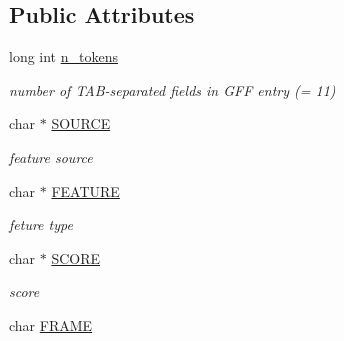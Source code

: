 \subsection*{Public Attributes}
\begin{DoxyCompactItemize}
\item 
\hypertarget{classGenomicRegionGFF_aaec963f555e7e807fb5046566622f5ee}{
long int \hyperlink{classGenomicRegionGFF_aaec963f555e7e807fb5046566622f5ee}{n\_\-tokens}}
\label{classGenomicRegionGFF_aaec963f555e7e807fb5046566622f5ee}

\begin{DoxyCompactList}\small\item\em number of TAB-\/separated fields in GFF entry (= 11) \end{DoxyCompactList}\item 
\hypertarget{classGenomicRegionGFF_a2f0d4a5f15d8a756233436af03341734}{
char $\ast$ \hyperlink{classGenomicRegionGFF_a2f0d4a5f15d8a756233436af03341734}{SOURCE}}
\label{classGenomicRegionGFF_a2f0d4a5f15d8a756233436af03341734}

\begin{DoxyCompactList}\small\item\em feature source \end{DoxyCompactList}\item 
\hypertarget{classGenomicRegionGFF_a0de447fbfad3da5b7a9cf07a5a6980f0}{
char $\ast$ \hyperlink{classGenomicRegionGFF_a0de447fbfad3da5b7a9cf07a5a6980f0}{FEATURE}}
\label{classGenomicRegionGFF_a0de447fbfad3da5b7a9cf07a5a6980f0}

\begin{DoxyCompactList}\small\item\em feture type \end{DoxyCompactList}\item 
\hypertarget{classGenomicRegionGFF_a0e92da1f0fd153504e0630f27229ba4d}{
char $\ast$ \hyperlink{classGenomicRegionGFF_a0e92da1f0fd153504e0630f27229ba4d}{SCORE}}
\label{classGenomicRegionGFF_a0e92da1f0fd153504e0630f27229ba4d}

\begin{DoxyCompactList}\small\item\em score \end{DoxyCompactList}\item 
\hypertarget{classGenomicRegionGFF_a42122a69eec385e0106e3861cb3b98f3}{
char \hyperlink{classGenomicRegionGFF_a42122a69eec385e0106e3861cb3b98f3}{FRAME}}
\label{classGenomicRegionGFF_a42122a69eec385e0106e3861cb3b98f3}


\end{DoxyCompactItemize}
